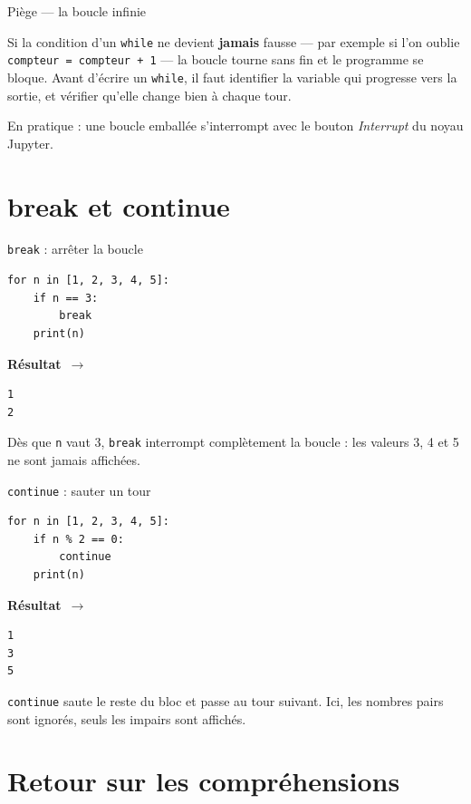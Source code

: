 \documentclass[aspectratio=169,11pt]{beamer}
\newcommand{\resultat}{{\scriptsize\textbf{R\'esultat}~$\rightarrow$}\par\vspace{1pt}}
\begin{document}
\begin{frame}{Piège — la boucle infinie}
\begin{ucadpiege}
{\small Si la condition d'un \texttt{while} ne devient \textbf{jamais} fausse — par exemple si l'on oublie \texttt{compteur = compteur + 1} — la boucle tourne sans fin et le programme se bloque. Avant d'écrire un \texttt{while}, il faut identifier la variable qui progresse vers la sortie, et vérifier qu'elle change bien à chaque tour.}
\end{ucadpiege}
{\small En pratique : une boucle emballée s'interrompt avec le bouton \emph{Interrupt} du noyau Jupyter.}
\end{frame}

\section{break et continue}

\begin{frame}[fragile]{\texttt{break} : arrêter la boucle}
\begin{lstlisting}
for n in [1, 2, 3, 4, 5]:
    if n == 3:
        break
    print(n)
\end{lstlisting}
\resultat
\begin{lstlisting}[style=out]
1
2
\end{lstlisting}
{\small Dès que \texttt{n} vaut 3, \texttt{break} interrompt complètement la boucle : les valeurs 3, 4 et 5 ne sont jamais affichées.}
\end{frame}

\begin{frame}[fragile]{\texttt{continue} : sauter un tour}
\begin{lstlisting}
for n in [1, 2, 3, 4, 5]:
    if n % 2 == 0:
        continue
    print(n)
\end{lstlisting}
\resultat
\begin{lstlisting}[style=out]
1
3
5
\end{lstlisting}
{\small \texttt{continue} saute le reste du bloc et passe au tour suivant. Ici, les nombres pairs sont ignorés, seuls les impairs sont affichés.}
\end{frame}

\section{Retour sur les compréhensions}
\end{document}
